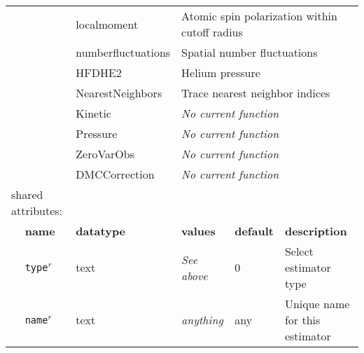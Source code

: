 \begin{table}[h]
\begin{center}
\begin{tabularx}{\textwidth}{l l l l l l }
\multicolumn{2}{l}{                } & localmoment        & \multicolumn{3}{l}{Atomic spin polarization within cutoff radius}\\
\multicolumn{2}{l}{                } & numberfluctuations & \multicolumn{3}{l}{Spatial number fluctuations}\\
\multicolumn{2}{l}{                } & HFDHE2             & \multicolumn{3}{l}{Helium pressure}\\
\multicolumn{2}{l}{                } & NearestNeighbors   & \multicolumn{3}{l}{Trace nearest neighbor indices}\\
\multicolumn{2}{l}{                } & Kinetic            & \multicolumn{3}{l}{\textit{No current function}}\\
\multicolumn{2}{l}{                } & Pressure           & \multicolumn{3}{l}{\textit{No current function}}\\
\multicolumn{2}{l}{                } & ZeroVarObs         & \multicolumn{3}{l}{\textit{No current function}}\\
\multicolumn{2}{l}{                } & DMCCorrection      & \multicolumn{3}{l}{\textit{No current function}}\\
\multicolumn{2}{l}{shared attributes:} & \multicolumn{4}{l}{}\\
   &   \bfseries name     & \bfseries datatype & \bfseries values & \bfseries default   & \bfseries description \\
   &   \texttt{type}$^r$      &  text              & \textit{See above}        & 0                   & Select estimator type         \\
   &   \texttt{name}$^r$      &  text              & \textit{anything}         & any                 & Unique name for this estimator\\
\hline
\end{tabularx}
\end{center}
\end{table}
\FloatBarrier

